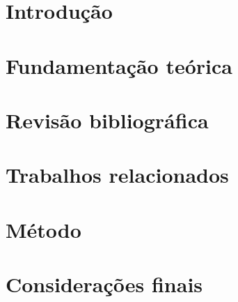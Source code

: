\documentclass[qualificacao, mestrado]{packages/icmc}
\begin{document}
\textual

\chapter{Introdução}
\label{cap:introducao}


\chapter{Fundamentação teórica}
\label{cap:fundamentacao}


\chapter{Revisão bibliográfica}
\label{cap:revisao}

\chapter{Trabalhos relacionados}
\label{cap:trab_relacionados}

\chapter{Método}
\label{cap:metodo}

\chapter{Considerações finais}
\label{cap:cons_finais}

%


% 








\glsaddall
\printglossaries


%
\end{document}
